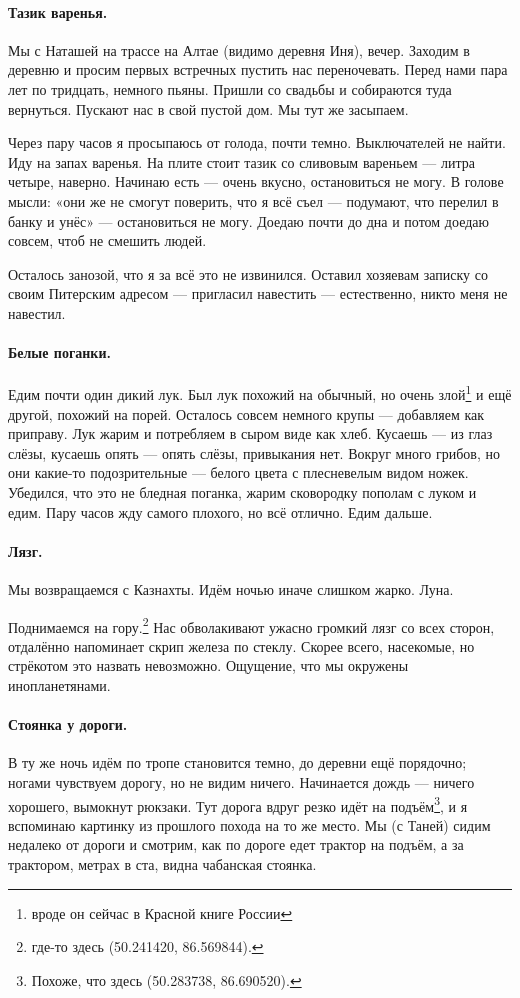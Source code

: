 \documentclass{book}
\begin{document}
\paragraph{Тазик варенья.}
Мы с Наташей на трассе на Алтае (видимо деревня Иня), вечер.
Заходим в деревню и просим первых встречных пустить нас переночевать.
Перед нами пара лет по тридцать, немного пьяны.
Пришли со свадьбы и собираются туда вернуться.
Пускают нас в свой пустой дом.
Мы тут же засыпаем.

Через пару часов я просыпаюсь от голода, почти темно.
Выключателей не найти.
Иду на запах варенья.
На плите стоит тазик со сливовым вареньем --- литра четыре, наверно.
Начинаю есть --- очень вкусно, остановиться не могу.
В голове мысли: «они же не смогут поверить, что я всё съел --- подумают, что перелил в банку и унёс» --- остановиться не могу.
Доедаю почти до дна и потом доедаю совсем, чтоб не смешить людей.

Осталось занозой, что я за всё это не извинился.
Оставил хозяевам записку со своим Питерским адресом --- пригласил навестить --- естественно, никто меня не навестил.

\paragraph{Белые поганки.}
Едим почти один дикий лук.
Был лук похожий на обычный, но очень злой\footnote{вроде он сейчас в Красной книге России} и ещё другой, похожий на порей.
Осталось совсем немного крупы --- добавляем как приправу.
Лук жарим и потребляем в сыром виде как хлеб.
Кусаешь --- из глаз слёзы, кусаешь опять --- опять слёзы, привыкания нет.
Вокруг много грибов, но они какие-то подозрительные --- белого цвета с плесневелым видом ножек.
Убедился, что это не бледная поганка, жарим сковородку пополам с луком и едим.
Пару часов жду самого плохого, но всё отлично.
Едим дальше.

\paragraph{Лязг.}
Мы возвращаемся с Казнахты.
Идём ночью иначе слишком жарко.
Луна.

Поднимаемся на гору.\footnote{где-то здесь (50.241420, 86.569844).}
Нас обволакивают ужасно громкий лязг со всех сторон, отдалённо напоминает скрип железа по стеклу.
Скорее всего, насекомые, но стрёкотом это назвать невозможно.
Ощущение, что мы окружены инопланетянами.

\paragraph{Стоянка у дороги.}
В ту же ночь идём по тропе становится темно, до деревни ещё порядочно;
ногами чувствуем дорогу, но не видим ничего.
Начинается дождь --- ничего хорошего, вымокнут рюкзаки.
Тут дорога вдруг резко идёт на подъём\footnote{Похоже, что здесь (50.283738, 86.690520).}, и я вспоминаю картинку из прошлого похода на то же место.
Мы (с Таней) сидим недалеко от дороги и смотрим, как по дороге едет трактор на подъём,
а за трактором, метрах в ста, видна чабанская стоянка.
\end{document}

